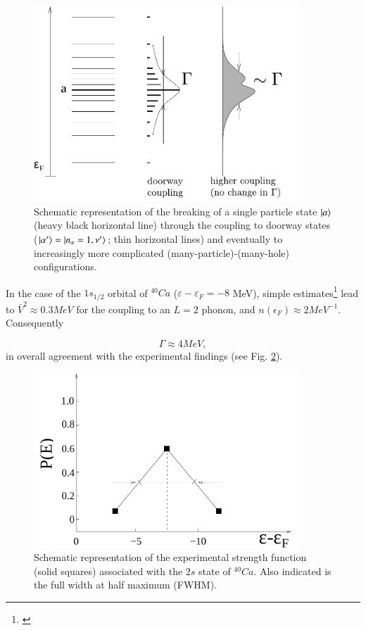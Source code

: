 \begin{figure}
\centerline {
\includegraphics*[width=10cm]{introduccion/figs/figintroD7}
}
\caption{Schematic representation of the breaking of a single particle state $|{a} \rangle$ (heavy black horizontal line) through the coupling to doorway states ($|{\alpha'} \rangle=|{n_\alpha=1,\nu'} \rangle$; thin horizontal lines) and eventually to increasingly more complicated (many-particle)-(many-hole) configurations.}
\label{fig:4.7}
\end{figure}

In the case of the $1s_{1/2}$ orbital of $^{40}Ca$ ($\varepsilon - \varepsilon_F = -8$ MeV), simple estimates\footnote{\cite{Mahaux:85}} lead to $\bar{V}^2 \approx 0.3 MeV$ for the coupling to an $L=2$ phonon, and $n(\epsilon_F) \approx 2MeV^{-1}$. Consequently

\begin{equation}
\Gamma \approx 4 MeV ,
\label{eqn:46}
\end{equation}
in overall agreement with the experimental findings (see Fig. \ref{fig:4.8}).
\begin{figure}[h!]
\centerline {
\includegraphics*[width=10cm]{introduccion/figs/figintroD8}}
\caption{Schematic representation of the experimental strength function (solid squares) associated with the $2s$ state of $^{40}Ca$. Also indicated is the full width at half maximum (FWHM).}
\label{fig:4.8}
\end{figure}

